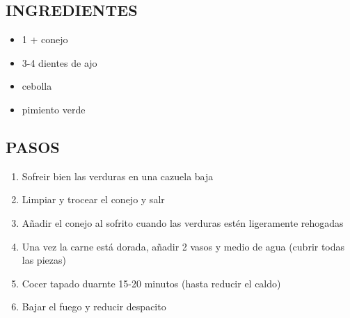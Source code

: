 
\subsection*{INGREDIENTES}
\begin{itemize}
    \item 1 +  conejo
    \item 3-4 dientes de ajo
    \item {} cebolla 
    \item {} pimiento verde

\end{itemize}

\subsection*{PASOS}
\begin{enumerate}
    \item Sofreir bien las verduras en una cazuela baja
    \item Limpiar y trocear el conejo y salr
    \item Añadir el conejo al sofrito cuando las verduras estén ligeramente rehogadas
    \item Una vez la carne está dorada, añadir 2 vasos y medio de agua (cubrir todas las piezas)
    \item Cocer tapado duarnte 15-20 minutos (hasta reducir el caldo)
    \item Bajar el fuego y reducir despacito
\end{enumerate}

